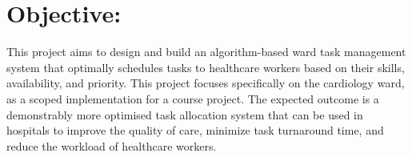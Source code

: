 \section{Objective:}
This project aims to design and build an algorithm-based ward task 
management system that optimally schedules tasks to healthcare workers 
based on their skills, availability, and priority.
This project focuses specifically on the cardiology ward,
as a scoped implementation for a course project.
The expected outcome is a demonstrably more optimised task allocation 
system that can be used in hospitals to improve the quality of care, 
minimize task turnaround time, and reduce the workload of healthcare workers.